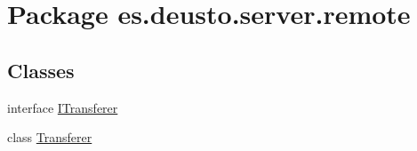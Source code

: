 \hypertarget{namespacees_1_1deusto_1_1server_1_1remote}{}\section{Package es.\+deusto.\+server.\+remote}
\label{namespacees_1_1deusto_1_1server_1_1remote}
\subsection*{Classes}
\begin{DoxyCompactItemize}
\item 
interface \hyperlink{interfacees_1_1deusto_1_1server_1_1remote_1_1_i_transferer}{I\+Transferer}
\item 
class \hyperlink{classes_1_1deusto_1_1server_1_1remote_1_1_transferer}{Transferer}
\end{DoxyCompactItemize}
